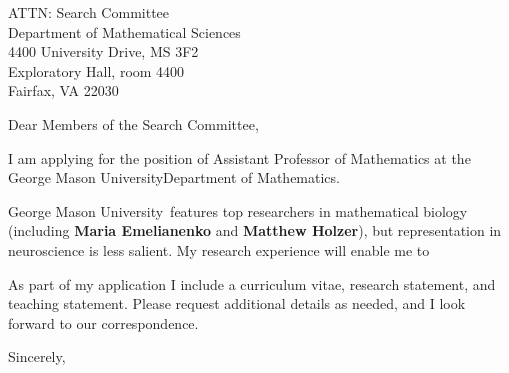 \documentclass[11pt,a4paper]{letter}
\begin{document}

\def\School{George Mason University}

\begin{letter}
{ATTN: Search Committee\\
Department of Mathematical Sciences\\
4400 University Drive, MS 3F2\\
Exploratory Hall, room 4400\\
Fairfax, VA 22030
}


\opening{Dear Members of the Search Committee,}

I am applying for the position of Assistant Professor of Mathematics at the \School Department of Mathematics. 



\School~features top researchers in mathematical biology (including \textbf{Maria Emelianenko} and \textbf{Matthew Holzer}), but representation in neuroscience is less salient. My research experience will enable me to 



As part of my application I include a curriculum vitae, research statement, and teaching statement. Please request additional details as needed, and I look forward to our correspondence.

\closing{Sincerely,}
\end{letter}
\end{document}
